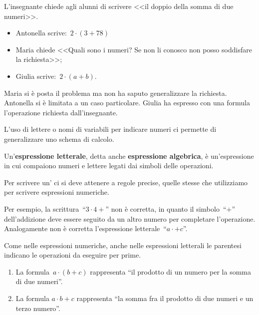 \begin{esempio}{}{}
 L'insegnante chiede agli alunni di scrivere 
 <<il doppio della somma di due numeri>>.

\begin{itemize} [nosep]
\item Antonella scrive:~\(2\cdot (3+78)\)
\item Maria chiede <<Quali sono i numeri? Se non li conosco non posso 
  soddisfare la richiesta>>;
\item Giulia scrive:~\(2\cdot (a+b)\).
\end{itemize}
Maria si è posta il problema ma non ha saputo generalizzare la richiesta. 
Antonella si è limitata a un caso particolare. 
Giulia ha espresso con una formula l'operazione richiesta dall'insegnante.
\end{esempio}

L'uso di lettere o nomi di variabili per indicare numeri ci permette 
di generalizzare uno schema di calcolo.


\begin{definizione}{}{}
Un'\textbf{espressione letterale}, detta anche \textbf{espressione
algebrica}, è un'espressione in cui compaiono 
numeri e lettere legati dai simboli delle operazioni.
\end{definizione}

Per scrivere un' ci si deve attenere a regole 
precise, quelle stesse che utilizziamo per scrivere espressioni numeriche.

Per esempio, la scrittura~``\(3\cdot 4+\)'' non è corretta, in quanto il 
simbolo~``\(+\)'' dell'addizione deve essere seguito da un altro numero 
per completare l'operazione. Analogamente non è corretta l'espressione 
letterale~``\(a \cdot + c\)''.

Come nelle espressioni numeriche, anche nelle espressioni letterali le 
parentesi indicano le operazioni da eseguire per prime.

\begin{esempio}{}{}
\begin{enumerate} [nosep]
\item 
La formula~\(a \cdot (b +c)\) rappresenta 
``il prodotto di un numero per la somma di due numeri''. 
\item 
La formula  \(a\cdot b +c\) rappresenta 
``la somma fra il prodotto di due numeri e un terzo numero''.
\end{enumerate}
\end{esempio}

